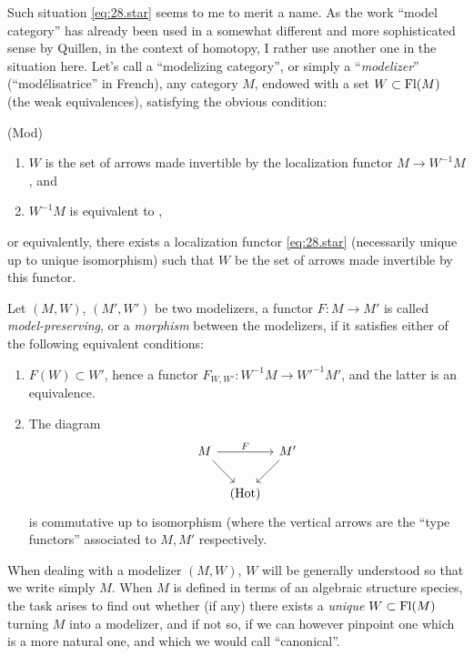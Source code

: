 Such situation \eqref{eq:28.star} seems to me to merit a name. As the
work ``model category'' has already been used in a somewhat different
and more sophisticated sense by Quillen, in the context of homotopy, I
rather use another one in the situation here. Let's call
a ``modelizing category'', or simply a ``\emph{modelizer}''
(``mod\'elisatrice'' in French), any category $M$, endowed with a set
$W \subset \operatorname{Fl}(M)$ (the weak equivalences), satisfying the obvious
condition:

\noindent\parbox[t]{0.1\textwidth}{(Mod)\par}
\parbox[t]{0.9\textwidth}{\vspace*{-11pt}%
  \begin{enumerate}[,label=\alph*)]
  \item\label{it:Mod.a}
    $W$ is the set of arrows made invertible by the localization
    functor $M \to W^{-1}M$, and
  \item\label{it:Mod.b}
    $W^{-1}M$ is equivalent to \Hot,
  \end{enumerate}}
or equivalently, there exists a localization functor
\eqref{eq:28.star} (necessarily unique up to unique isomorphism) such
that $W$ be the set of arrows made invertible by this functor.

Let $(M,W)$, $(M',W')$ be two modelizers, a functor $F: M\to M'$ is
called \emph{model-preserving}, or a \emph{morphism} between the
modelizers, if it satisfies either of the following equivalent
conditions:
\begin{enumerate}[label=(\roman*)]
\item $F(W) \subset W'$, hence a functor $F_{W,W'}: W^{-1}M \to
  W'^{-1}M'$, and the latter is an equivalence.
\item The diagram
\[  \begin{tikzcd}[column sep=tiny]
    M \ar[dr] \ar[rr, "F"] & & M'\ar[dl] \\ & \Hot &
  \end{tikzcd}\]
  is commutative up to isomorphism (where the vertical arrows are the
  ``type functors'' associated to $M,M'$ respectively.
\end{enumerate}
When dealing with a modelizer $(M,W)$, $W$ will be generally
understood so that we write simply $M$. When $M$ is defined in terms
of an algebraic structure species, the task arises to find out whether
(if any) there exists a \emph{unique} $W \subset \operatorname{Fl}(M)$ turning $M$
into a modelizer, and if not so, if we can however pinpoint one which
is a more natural one, and which we would call ``canonical''.

